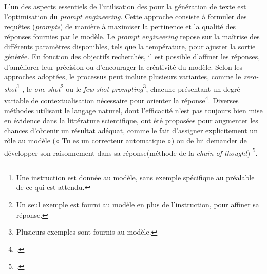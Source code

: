 L’un des aspects essentiels de l’utilisation des \llm pour la génération de texte est l'optimisation du \textit{prompt engineering}. Cette approche consiste à formuler des requêtes (\textit{prompts}) de manière à maximiser la pertinence et la qualité des réponses fournies par le modèle. Le \textit{prompt engineering} repose sur la maîtrise des différents paramètres disponibles, tels que la température, pour ajuster la sortie générée. En fonction des objectifs recherchés, il est possible d’affiner les réponses, d'améliorer leur précision ou d’encourager la créativité du modèle. Selon les approches adoptées, le processus peut inclure plusieurs variantes, comme le \textit{zero-shot}\footnote{Une instruction est donnée au modèle, sans exemple spécifique au préalable de ce qui est attendu.}  , le \textit{one-shot}\footnote{Un seul exemple est fourni au modèle en plus de l’instruction, pour affiner sa réponse.} ou le \textit{few-shot prompting}\footnote{Plusieurs exemples sont fournis au modèle.}, chacune présentant un degré variable de contextualisation nécessaire pour orienter la réponse\footcite{aryani_8_2023}. Diverses méthodes utilisant le langage naturel, dont l’efficacité n’est pas toujours bien mise en évidence dans la littérature scientifique, ont été proposées pour augmenter les chances d’obtenir un résultat adéquat, comme le fait d’assigner explicitement un rôle au modèle  (« Tu es un correcteur automatique ») ou de lui demander de développer son raisonnement dans sa réponse(méthode de la \textit{chain of thought}) \footcite{noauthor_prompt_nodate}. 

